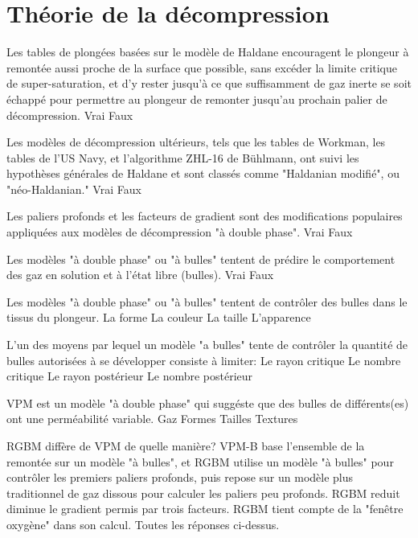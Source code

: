 \documentclass[english,12pt,a4paper]{article}
\begin{document}
	\section{Théorie de la décompression}

	\begin{outline}

		\1 Les tables de plongées basées sur le modèle de Haldane encouragent le plongeur à remontée aussi proche de la surface que possible, sans excéder la limite critique de super-saturation, et d'y rester jusqu'à ce que suffisamment de gaz inerte se soit échappé pour permettre au plongeur de remonter jusqu'au prochain palier de décompression.
			\2 Vrai
			\2 Faux

		\1 Les modèles de décompression ultérieurs, tels que les tables de Workman, les tables de l'US Navy, et l'algorithme ZHL-16 de Bühlmann, ont suivi les hypothèses générales de Haldane et sont classés comme "Haldanian modifié", ou "néo-Haldanian."
			\2 Vrai
			\2 Faux

		\1 Les paliers profonds et les facteurs de gradient sont des modifications populaires appliquées aux modèles de décompression "à double phase".
			\2 Vrai
			\2 Faux

		\1 Les modèles "à double phase" ou "à bulles" tentent de prédire le comportement des gaz en solution et à l'état libre (bulles).
			\2 Vrai
			\2 Faux

		\1 Les modèles "à double phase" ou "à bulles" tentent de contrôler \underline{\hspace{1.5cm}} des bulles dans le tissus du plongeur.
			\2 La forme
			\2 La couleur
			\2 La taille
			\2 L'apparence

		\1 L'un des moyens par lequel un modèle "a bulles" tente de contrôler la quantité de bulles autorisées à se développer consiste à limiter:
			\2 Le rayon critique
			\2 Le nombre critique
			\2 Le rayon postérieur
			\2 Le nombre postérieur

		\1 VPM est un modèle "à double phase" qui suggéste que des bulles de différents(es) \underline{\hspace{1.5cm}} ont une perméabilité variable.
			\2 Gaz
			\2 Formes
			\2 Tailles
			\2 Textures

		\1 RGBM diffère de VPM de quelle manière?
			\2 VPM-B base l'ensemble de la remontée sur un modèle "à bulles", et RGBM utilise un modèle "à bulles" pour contrôler les premiers paliers profonds, puis repose sur un modèle plus traditionnel de gaz dissous pour calculer les paliers peu profonds.
			\2 RGBM reduit diminue le gradient permis par trois facteurs.
			\2 RGBM tient compte de la "fenêtre oxygène" dans son calcul.
			\2 Toutes les réponses ci-dessus.
	\end{outline}
	\pagebreak
\end{document}
